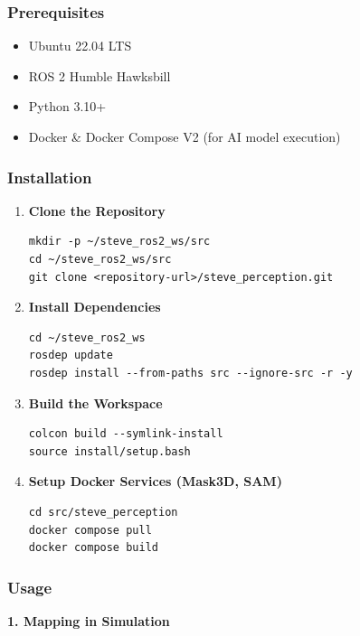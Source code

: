 \documentclass[12pt,oneside,a4paper]{article}
\begin{document}
\subsubsection{Prerequisites}
\begin{itemize}
    \item Ubuntu 22.04 LTS
    \item ROS 2 Humble Hawksbill
    \item Python 3.10+
    \item Docker \& Docker Compose V2 (for AI model execution)
\end{itemize}

\subsubsection{Installation}

\begin{enumerate}
    \item \textbf{Clone the Repository}
    \begin{lstlisting}[style=bashstyle]
mkdir -p ~/steve_ros2_ws/src
cd ~/steve_ros2_ws/src
git clone <repository-url>/steve_perception.git
    \end{lstlisting}

    \item \textbf{Install Dependencies}
    \begin{lstlisting}[style=bashstyle]
cd ~/steve_ros2_ws
rosdep update
rosdep install --from-paths src --ignore-src -r -y
    \end{lstlisting}

    \item \textbf{Build the Workspace}
    \begin{lstlisting}[style=bashstyle]
colcon build --symlink-install
source install/setup.bash
    \end{lstlisting}

    \item \textbf{Setup Docker Services (Mask3D, SAM)}
    \begin{lstlisting}[style=bashstyle]
cd src/steve_perception
docker compose pull
docker compose build
    \end{lstlisting}
\end{enumerate}

\subsubsection{Usage}

\textbf{1. Mapping in Simulation}
\end{document}
